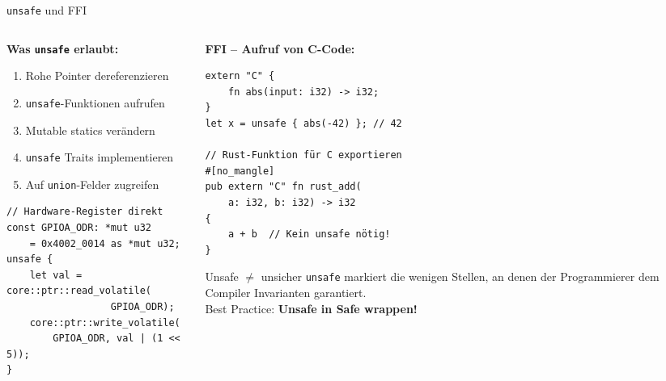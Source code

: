 \documentclass[%
  aspectratio=169,
  10pt
]{beamer}
\begin{document}
\begin{frame}[fragile]{\texttt{unsafe} und FFI}
  \begin{columns}[T]
    \begin{column}{0.50\textwidth}
      \textbf{Was \texttt{unsafe} erlaubt:}
      \small
      \begin{enumerate}
        \item Rohe Pointer dereferenzieren
        \item \texttt{unsafe}-Funktionen aufrufen
        \item Mutable statics verändern
        \item \texttt{unsafe} Traits implementieren
        \item Auf \texttt{union}-Felder zugreifen
      \end{enumerate}
\begin{lstlisting}
// Hardware-Register direkt
const GPIOA_ODR: *mut u32
    = 0x4002_0014 as *mut u32;
unsafe {
    let val = core::ptr::read_volatile(
                  GPIOA_ODR);
    core::ptr::write_volatile(
        GPIOA_ODR, val | (1 << 5));
}
\end{lstlisting}
    \end{column}
    \begin{column}{0.47\textwidth}
      \textbf{FFI -- Aufruf von C-Code:}
\begin{lstlisting}
extern "C" {
    fn abs(input: i32) -> i32;
}
let x = unsafe { abs(-42) }; // 42

// Rust-Funktion für C exportieren
#[no_mangle]
pub extern "C" fn rust_add(
    a: i32, b: i32) -> i32
{
    a + b  // Kein unsafe nötig!
}
\end{lstlisting}
      \begin{alertblock}{Unsafe $\neq$ unsicher}
        \small \texttt{unsafe} markiert die wenigen Stellen,
        an denen der Programmierer dem Compiler
        Invarianten garantiert.\\
        Best Practice: \textbf{Unsafe in Safe wrappen!}
      \end{alertblock}
    \end{column}
  \end{columns}
\end{frame}
\end{document}

